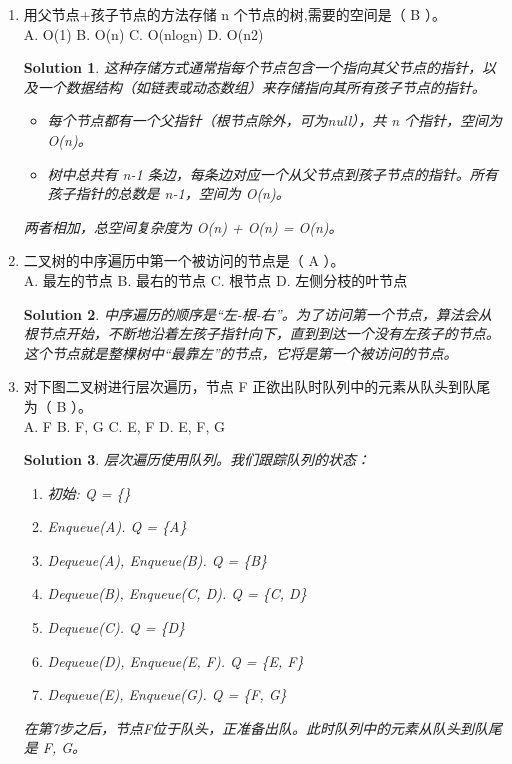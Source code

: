 \documentclass[UTF8]{report}
\newtheorem{solution}{Solution}
\theoremstyle{MyLineTheoremStyle} %
\theoremstyle{MyBlockTheoremStyle} %
\theoremstyle{MySubsubsectionStyle} %
\begin{document}
\begin{enumerate}
    \item 用父节点+孩子节点的方法存储 n 个节点的树,需要的空间是（ B ）。\\
    A. O(1) \quad B. O(n) \quad C. O(nlogn) \quad D. O(n2)
    \begin{solution}
        这种存储方式通常指每个节点包含一个指向其父节点的指针，以及一个数据结构（如链表或动态数组）来存储指向其所有孩子节点的指针。
        \begin{itemize}
            \item 每个节点都有一个父指针（根节点除外，可为null），共 n 个指针，空间为 O(n)。
            \item 树中总共有 n-1 条边，每条边对应一个从父节点到孩子节点的指针。所有孩子指针的总数是 n-1，空间为 O(n)。
        \end{itemize}
        两者相加，总空间复杂度为 O(n) + O(n) = O(n)。
    \end{solution}

    \item 二叉树的中序遍历中第一个被访问的节点是（ A ）。\\
    A. 最左的节点 \quad B. 最右的节点 \quad C. 根节点 \quad D. 左侧分枝的叶节点
    \begin{solution}
        中序遍历的顺序是“左-根-右”。为了访问第一个节点，算法会从根节点开始，不断地沿着左孩子指针向下，直到到达一个没有左孩子的节点。这个节点就是整棵树中“最靠左”的节点，它将是第一个被访问的节点。
    \end{solution}

    \item 对下图二叉树进行层次遍历，节点 F 正欲出队时队列中的元素从队头到队尾为（ B ）。\\
    A. F \quad B. F, G \quad C. E, F \quad D. E, F, G
    \begin{solution}
        层次遍历使用队列。我们跟踪队列的状态：
        \begin{enumerate}
            \item 初始: Q = \{\}
            \item Enqueue(A). Q = \{A\}
            \item Dequeue(A), Enqueue(B). Q = \{B\}
            \item Dequeue(B), Enqueue(C, D). Q = \{C, D\}
            \item Dequeue(C). Q = \{D\}
            \item Dequeue(D), Enqueue(E, F). Q = \{E, F\}
            \item Dequeue(E), Enqueue(G). Q = \{F, G\}
        \end{enumerate}
        在第7步之后，节点F位于队头，正准备出队。此时队列中的元素从队头到队尾是 F, G。
    \end{solution}


\end{enumerate}
\end{document}
